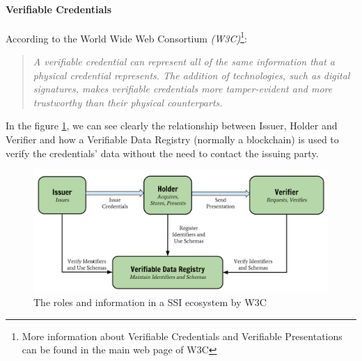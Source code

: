 \documentclass[a4paper, 12pt]{article} %
\begin{document}
                \paragraph{Verifiable Credentials}
                    According to the World Wide Web Consortium \textit{(W3C)}\cite{w3c-vc}\footnote{\label{footnote-w3c}More information about Verifiable Credentials and Verifiable Presentations can be found in the main web page of W3C\cite{w3c-vc}}:
                    \begin{quote}
                        \textit{A verifiable credential can represent all of the same information that a physical credential represents. The addition of technologies, such as digital signatures, makes verifiable credentials more tamper-evident and more trustworthy than their physical counterparts.}
                    \end{quote}
                    In the figure \ref{fig:ssi-vc}, we can see clearly the relationship between Issuer, Holder and Verifier and how a Verifiable Data Registry (normally a blockchain) is used to verify the credentials’ data without the need to contact the issuing party.
                    \begin{figure}[h]
                        \centering
                        \includegraphics[width=1.0\textwidth]{ssi-vc.png}
                        \caption{The roles and information in a SSI ecosystem by W3C}
                        \label{fig:ssi-vc}
                    \end{figure}
                
\end{document}

